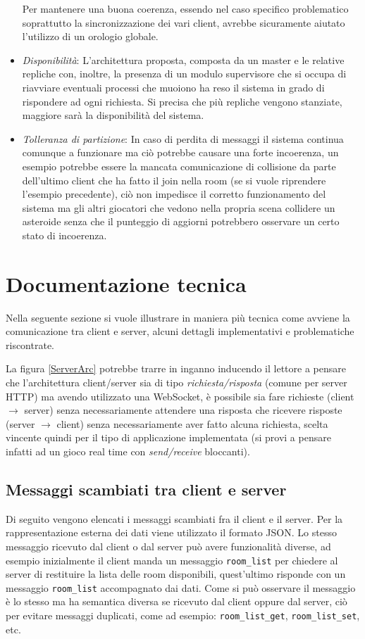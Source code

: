 \documentclass[paper=a4, fontsize=11pt]{scrartcl} %
\numberwithin{equation}{section} %
\numberwithin{figure}{section} %
\numberwithin{table}{section} %
\begin{document}
\begin{itemize}
Per mantenere una buona coerenza, essendo nel caso specifico problematico soprattutto la sincronizzazione dei vari client, avrebbe sicuramente aiutato l'utilizzo di un orologio globale.
\item \textit{Disponibilità}: L'architettura proposta, composta da un master e le relative repliche con, inoltre, la presenza di un modulo supervisore che si occupa di riavviare eventuali processi che muoiono ha reso il sistema in grado di rispondere ad ogni richiesta. Si precisa che più repliche vengono stanziate, maggiore sarà la disponibilità del sistema.
\item \textit{Tolleranza di partizione}: In caso di perdita di messaggi il sistema continua comunque a funzionare ma ciò potrebbe causare una forte incoerenza, un esempio potrebbe essere la mancata comunicazione di collisione da parte dell'ultimo client che ha fatto il join nella room (se si vuole riprendere l'esempio precedente), ciò non impedisce il corretto funzionamento del sistema ma gli altri giocatori che vedono nella propria scena collidere un asteroide senza che il punteggio di aggiorni potrebbero osservare un certo stato di incoerenza.
\end{itemize}

\section{Documentazione tecnica}
Nella seguente sezione si vuole illustrare in maniera più tecnica come avviene la comunicazione tra client e server, alcuni dettagli implementativi e problematiche riscontrate.

La figura \ref{ServerArc} potrebbe trarre in inganno inducendo il lettore a pensare che l'architettura client/server sia di tipo \textit{richiesta/risposta} (comune per server HTTP) ma avendo utilizzato una WebSocket, è possibile sia fare richieste (client $\rightarrow$ server) senza necessariamente attendere una risposta che ricevere risposte (server $\rightarrow$ client) senza necessariamente aver fatto alcuna richiesta, scelta vincente quindi per il tipo di applicazione implementata (si provi a pensare infatti ad un gioco real time con \textit{send/receive} bloccanti).

\subsection{Messaggi scambiati tra client e server}

Di seguito vengono elencati i messaggi scambiati fra il client e il server. Per la rappresentazione esterna dei dati viene utilizzato il formato JSON. Lo stesso messaggio ricevuto dal client o dal server può avere funzionalità diverse, ad esempio inizialmente il client manda un messaggio \texttt{room\_list} per chiedere al server di restituire la lista delle room disponibili, quest'ultimo risponde con un messaggio \texttt{room\_list} accompagnato dai dati. Come si può osservare il messaggio è lo stesso ma ha semantica diversa se ricevuto dal client oppure dal server, ciò per evitare messaggi duplicati, come ad esempio: \texttt{room\_list\_get}, \texttt{room\_list\_set}, etc.
\end{document}
